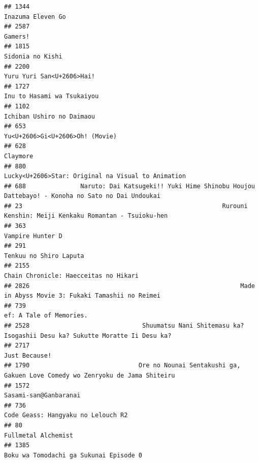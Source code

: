 \documentclass[
]{article}
\begin{document}
\begin{verbatim}
## 1344                                                                                         Inazuma Eleven Go
## 2587                                                                                                   Gamers!
## 1815                                                                                          Sidonia no Kishi
## 2200                                                                                 Yuru Yuri San<U+2606>Hai!
## 1727                                                                                Inu to Hasami wa Tsukaiyou
## 1102                                                                                 Ichiban Ushiro no Daimaou
## 653                                                                            Yu<U+2606>Gi<U+2606>Oh! (Movie)
## 628                                                                                                   Claymore
## 880                                                         Lucky<U+2606>Star: Original na Visual to Animation
## 688               Naruto: Dai Katsugeki!! Yuki Hime Shinobu Houjou Dattebayo! - Konoha no Sato no Dai Undoukai
## 23                                                       Rurouni Kenshin: Meiji Kenkaku Romantan - Tsuioku-hen
## 363                                                                                           Vampire Hunter D
## 291                                                                                     Tenkuu no Shiro Laputa
## 2155                                                                     Chain Chronicle: Haecceitas no Hikari
## 2826                                                          Made in Abyss Movie 3: Fukaki Tamashii no Reimei
## 739                                                                                    ef: A Tale of Memories.
## 2528                               Shuumatsu Nani Shitemasu ka? Isogashii Desu ka? Sukutte Moratte Ii Desu ka?
## 2717                                                                                             Just Because!
## 1790                              Ore no Nounai Sentakushi ga, Gakuen Love Comedy wo Zenryoku de Jama Shiteiru
## 1572                                                                                     Sasami-san@Ganbaranai
## 736                                                                         Code Geass: Hangyaku no Lelouch R2
## 80                                                                                         Fullmetal Alchemist
## 1385                                                                    Boku wa Tomodachi ga Sukunai Episode 0

\end{verbatim}
\end{document}
